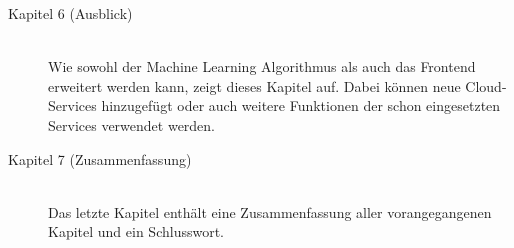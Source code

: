 \begin{description}
    \item[Kapitel 6 (Ausblick)]\hfill \\
    Wie sowohl der Machine Learning Algorithmus als auch das Frontend erweitert werden kann, zeigt dieses Kapitel auf.
    Dabei können neue Cloud-Services hinzugefügt oder auch weitere Funktionen der schon eingesetzten Services verwendet
    werden.

    \item[Kapitel 7 (Zusammenfassung)]\hfill \\
    Das letzte Kapitel enthält eine Zusammenfassung aller vorangegangenen Kapitel und ein Schlusswort.

\end{description}